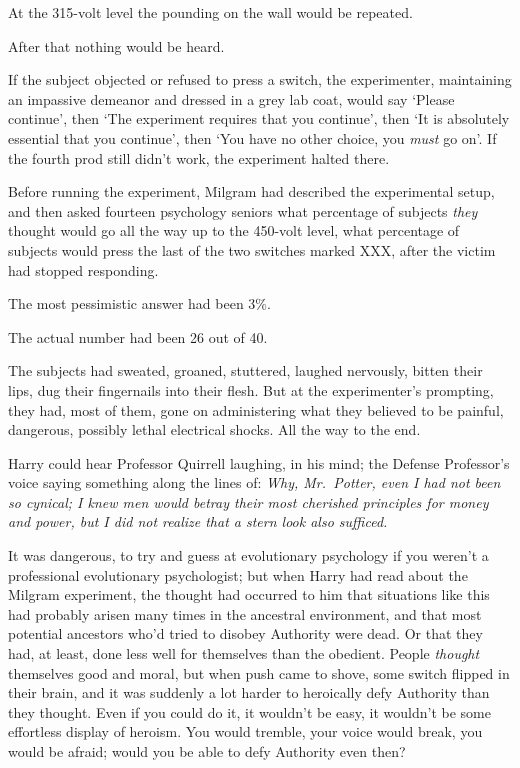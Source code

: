 At the 315-volt level the pounding on the wall would be repeated.

After that nothing would be heard.

If the subject objected or refused to press a switch, the experimenter,
maintaining an impassive demeanor and dressed in a grey lab coat, would say
`Please continue', then `The experiment requires that you continue', then `It
is absolutely essential that you continue', then `You have no other choice, you
\emph{must} go on'. If the fourth prod still didn't work, the experiment halted
there.

Before running the experiment, Milgram had described the experimental setup,
and then asked fourteen psychology seniors what percentage of subjects
\emph{they} thought would go all the way up to the 450-volt level, what
percentage of subjects would press the last of the two switches marked XXX,
after the victim had stopped responding.

The most pessimistic answer had been 3\%.

The actual number had been 26 out of 40.

The subjects had sweated, groaned, stuttered, laughed nervously, bitten their
lips, dug their fingernails into their flesh. But at the experimenter's
prompting, they had, most of them, gone on administering what they believed to
be painful, dangerous, possibly lethal electrical shocks. All the way to the
end.

Harry could hear Professor Quirrell laughing, in his mind; the Defense
Professor's voice saying something along the lines of: \emph{Why, Mr.~Potter,
even I had not been so cynical; I knew men would betray their most cherished
principles for money and power, but I did not realize that a stern look also
sufficed.}

It was dangerous, to try and guess at evolutionary psychology if you weren't a
professional evolutionary psychologist; but when Harry had read about the
Milgram experiment, the thought had occurred to him that situations like this
had probably arisen many times in the ancestral environment, and that most
potential ancestors who'd tried to disobey Authority were dead. Or that they
had, at least, done less well for themselves than the obedient. People
\emph{thought} themselves good and moral, but when push came to shove, some
switch flipped in their brain, and it was suddenly a lot harder to heroically
defy Authority than they thought. Even if you could do it, it wouldn't be easy,
it wouldn't be some effortless display of heroism. You would tremble, your
voice would break, you would be afraid; would you be able to defy Authority
even then?

